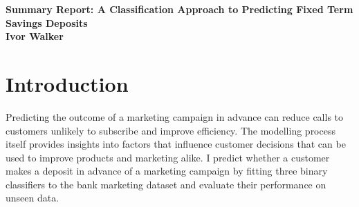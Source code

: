 \documentclass[9pt]{article}
\begin{document}
\begin{titlepage}
    \vspace*{\fill}    
    \begin{center}
        {\Huge \textbf{
            Summary Report: A Classification Approach to Predicting Fixed Term Savings Deposits 
        }} \\[1cm]
        {\Large \textbf{
            Ivor Walker 
        }} \\[1cm]
    \end{center}
    \vspace*{\fill} 
\end{titlepage}

\newpage
\section{Introduction}
\vspace{-0.25cm}
Predicting the outcome of a marketing campaign in advance can reduce calls to customers unlikely to subscribe and improve efficiency. The modelling process itself provides insights into factors that influence customer decisions that can be used to improve products and marketing alike. I predict whether a customer makes a deposit in advance of a marketing campaign by fitting three binary classifiers to the bank marketing dataset and evaluate their performance on unseen data.
\end{document}
